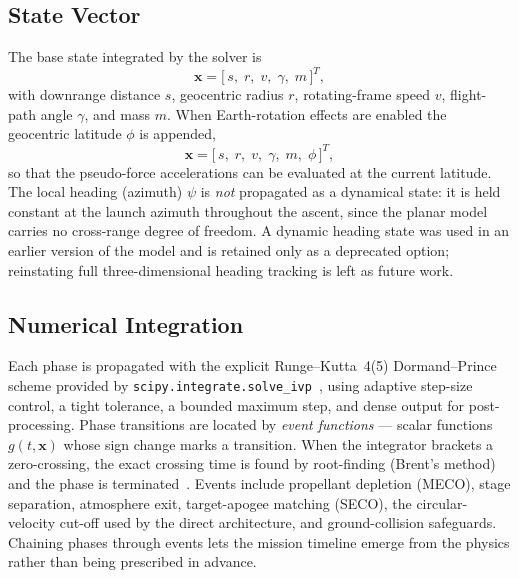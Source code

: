 \subsection{State Vector}
\label{ssec:state_vector}

The base state integrated by the solver is
\begin{equation}
  \mathbf{x} = \bigl[\,s,\; r,\; v,\; \gamma,\; m\,\bigr]^{T},
  \label{eq:state_base}
\end{equation}
with downrange distance $s$, geocentric radius $r$, rotating-frame speed $v$,
flight-path angle $\gamma$, and mass $m$. When Earth-rotation effects are enabled
the geocentric latitude $\phi$ is appended,
\begin{equation}
  \mathbf{x} = \bigl[\,s,\; r,\; v,\; \gamma,\; m,\; \phi\,\bigr]^{T},
  \label{eq:state_rot}
\end{equation}
so that the pseudo-force accelerations can be evaluated at the current latitude.
The local heading (azimuth) $\psi$ is \emph{not} propagated as a dynamical state:
it is held constant at the launch azimuth throughout the ascent, since the planar
model carries no cross-range degree of freedom. A dynamic heading state was used
in an earlier version of the model and is retained only as a deprecated option;
reinstating full three-dimensional heading tracking is left as future work.

\subsection{Numerical Integration}
\label{ssec:integration_sim}

Each phase is propagated with the explicit Runge--Kutta~4(5) Dormand--Prince
scheme provided by \texttt{scipy.integrate.solve\_ivp}~\cite{dormand1980family,
virtanen2020scipy}, using adaptive step-size control, a tight tolerance, a bounded
maximum step, and dense output for post-processing. Phase transitions are located
by \emph{event functions} --- scalar functions $g(t,\mathbf{x})$ whose sign change
marks a transition. When the integrator brackets a zero-crossing, the exact
crossing time is found by root-finding (Brent's method) and the phase is
terminated~\cite{brent1973algorithms}. Events include propellant depletion
(MECO), stage separation, atmosphere exit, target-apogee matching (SECO), the
circular-velocity cut-off used by the direct architecture, and ground-collision
safeguards. Chaining phases through events lets the mission timeline emerge from
the physics rather than being prescribed in advance.

